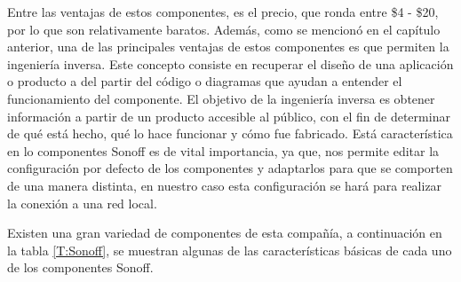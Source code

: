 Entre las ventajas de estos componentes, es el precio, que ronda entre \$4 - \$20, por lo que son relativamente baratos. Además, como se mencionó en el capítulo anterior, una de las principales ventajas de estos componentes es que permiten la ingeniería inversa. Este concepto consiste en recuperar el diseño de una aplicación o producto a del partir del código o diagramas que ayudan a entender el funcionamiento del componente. El objetivo de la ingeniería inversa es obtener información a partir de un producto accesible al público, con el fin de determinar de qué está hecho, qué lo hace funcionar y cómo fue fabricado. Está característica en lo componentes Sonoff es de vital importancia, ya que, nos permite editar la configuración por defecto de los componentes y adaptarlos para que se comporten de una manera distinta, en nuestro caso esta configuración se hará para realizar la conexión a una red local. 
 
Existen una gran variedad de componentes de esta compañía, a continuación en la tabla \ref{T:Sonoff}, se muestran algunas de las características básicas de cada uno de los componentes Sonoff.

